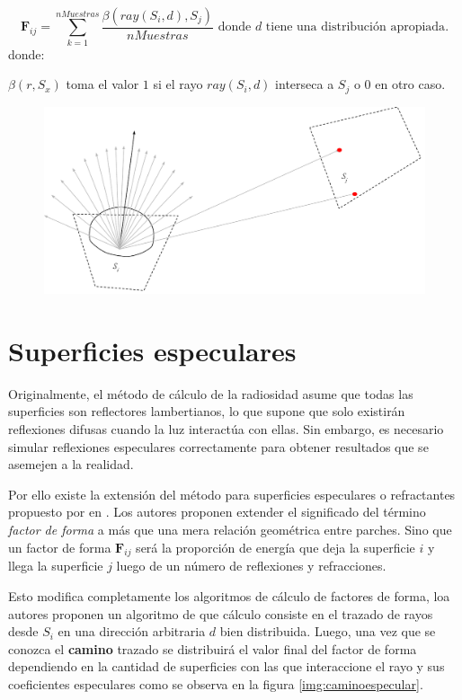 \begin{equation}
	\mathbf{F}_{ij} = \sum_{k=1}^{nMuestras} \frac{\beta(ray(S_{i},d), S_{j})}{nMuestras} \text{ donde } d \text{ tiene una distribución apropiada}.
	\label{eq:ffhemiesfera}
\end{equation}
donde:

$\beta(r, S_{x})$ toma el valor $1$ si el rayo $ray(S_{i},d)$ interseca a $S_{j}$ o $0$ en otro caso.

\vspace{5mm}
\begin{figure}[H]
	\centering
	\includegraphics[width=\linewidth]{assets/Raytracing}
	\label{img:ff}
\end{figure}

\section{Superficies especulares}

Originalmente, el método de cálculo de la radiosidad asume que todas las superficies son reflectores lambertianos, lo que supone que solo existirán reflexiones difusas cuando la luz interactúa con ellas. Sin embargo, es necesario simular reflexiones especulares correctamente para obtener resultados que se asemejen a la realidad.

Por ello existe la extensión del método para superficies especulares o refractantes propuesto por \citeauthor{Sillion} en \citeyear{Sillion}. Los autores proponen extender el significado del término \textit{factor de forma} a más que una mera relación geométrica entre parches. Sino que un factor de forma $\mathbf{F}_{ij}$ será la proporción de energía que deja la superficie $i$ y llega la superficie $j$ luego de un número de reflexiones y refracciones.

Esto modifica completamente los algoritmos de cálculo de factores de forma, loa autores proponen un algoritmo de  que cálculo consiste en el trazado de rayos desde $S_{i}$ en una dirección arbitraria $d$ bien distribuida.  Luego, una vez que se conozca el \textbf{camino} trazado se distribuirá el valor final del factor de forma dependiendo en la cantidad de superficies con las que interaccione el rayo y sus coeficientes especulares como se observa en la figura \ref{img:caminoespecular}.

